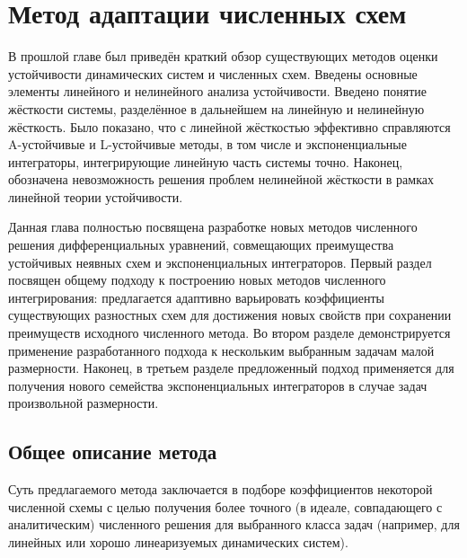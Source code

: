 \chapter{Метод адаптации численных схем}
\label{chapter:methods} 

В прошлой главе был приведён краткий обзор существующих методов оценки устойчивости динамических систем и численных схем.
Введены основные элементы линейного и нелинейного анализа устойчивости.
Введено понятие жёсткости системы, разделённое в дальнейшем на линейную и нелинейную жёсткость.
Было показано, что с линейной жёсткостью эффективно справляются A-устойчивые и L-устойчивые методы,
в том числе и экспоненциальные интеграторы, интегрирующие линейную часть системы точно.
Наконец, обозначена невозможность решения проблем нелинейной жёсткости в рамках линейной теории устойчивости.

Данная глава полностью посвящена разработке новых методов численного решения дифференциальных уравнений,
совмещающих преимущества устойчивых неявных схем и экспоненциальных интеграторов.
Первый раздел посвящен общему подходу к построению новых методов численного интегрирования:
предлагается адаптивно варьировать коэффициенты существующих разностных схем
для достижения новых свойств при сохранении преимуществ исходного численного метода.
Во втором разделе демонстрируется применение разработанного подхода к нескольким выбранным задачам малой размерности.
Наконец, в третьем разделе предложенный подход применяется для получения нового семейства
экспоненциальных интеграторов в случае задач произвольной размерности.


\section{Общее описание метода}
\label{section:methods:description}

Суть предлагаемого метода заключается в подборе коэффициентов некоторой численной схемы
с целью получения более точного (в идеале, совпадающего с аналитическим) численного решения
для выбранного класса задач (например, для линейных или хорошо линеаризуемых динамических систем).

